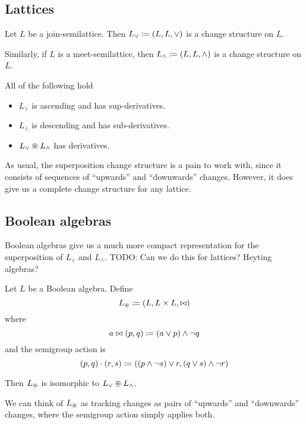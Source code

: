 \subsection{Lattices}

\begin{defn}
  Let $L$ be a join-semilattice. Then $L_\vee \coloneqq (L,L,\vee)$ is a change
  structure on $L$.

  Similarly, if $L$ is a meet-semilattice, then $L_\wedge \coloneqq (L,L,\wedge)$ is a change
  structure on $L$.
\end{defn}

\begin{prop}
  All of the following hold
  \begin{itemize}
    \item $L_\vee$ is ascending and has sup-derivatives.
    \item $L_\wedge$ is descending and has sub-derivatives.
    \item $L_\vee \circledast L_\wedge$ has derivatives.
  \end{itemize}
\end{prop}

As usual, the superposition change structure is a pain to work with, since it
consists of sequences of ``upwards'' and ``downwards'' changes. However, it does
give us a complete change structure for any lattice.

\subsection{Boolean algebras}

Boolean algebras give us a much more compact representation for the
superposition of $L_\vee$ and $L_\wedge$.
TODO: Can we do this for lattices? Heyting algebras?

\begin{prop}
  Let $L$ be a Boolean algebra. Define
  $$L_\circledast \coloneqq (L,L \times L,\bowtie)$$
  where
  $$a \bowtie (p, q) \coloneqq (a \vee p) \wedge \neg q$$
  and the semigroup action is
  $$(p, q) \cdot (r, s) \coloneqq ((p \wedge \neg s) \vee r, (q \vee s) \wedge \neg r)$$

  Then $L_\circledast$ is isomorphic to $L_\vee \circledast L_\wedge$.
\end{prop}

We can think of $L_\circledast$ as tracking changes as pairs of ``upwards'' and
``downwards'' changes, where the semigroup action simply applies both.


